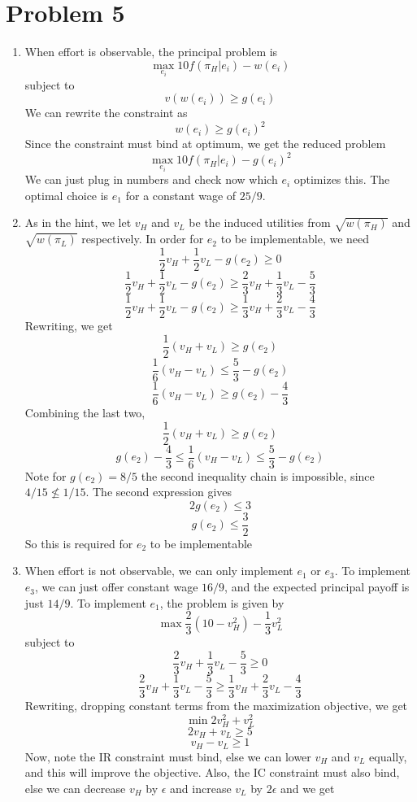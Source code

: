 \documentclass[10pt,letter]{article}
\begin{document}
\section*{Problem 5}
\begin{enumerate}[label=(\alph*)]
\item When effort is observable, the principal problem is
\[ \max_{e_i} 10 f(\pi_H|e_i) - w(e_i) \]
subject to
\[  v(w(e_i)) \ge g(e_i)\]
We can rewrite the constraint as
\[ w(e_i) \ge g(e_i)^2 \]
Since the constraint must bind at optimum, we get the reduced problem
\[ \max_{e_i} 10 f(\pi_H|e_i)  - g(e_i)^2 \]
We can just plug in numbers and check now which $e_i$ optimizes this. The optimal choice is $e_1$ for a constant wage of $25/9$.
\item As in the hint, we let $v_H$ and $v_L$ be the induced utilities from $\sqrt{w(\pi_H)}$ and $\sqrt{w(\pi_L)}$ respectively. In order for $e_2$ to be implementable, we need
\[ \frac{1}{2}v_H + \frac{1}{2} v_L - g(e_2) \ge 0 \]
\[ \frac{1}{2}v_H + \frac{1}{2} v_L - g(e_2) \ge \frac{2}{3}v_H + \frac{1}{3}v_L - \frac{5}{3} \]
\[ \frac{1}{2}v_H + \frac{1}{2} v_L - g(e_2) \ge \frac{1}{3}v_H + \frac{2}{3}v_L - \frac{4}{3} \]
Rewriting, we get
\[ \frac{1}{2}(v_H + v_L) \ge g(e_2) \]
\[   \frac{1}{6} (v_H - v_L) \le \frac{5}{3} - g(e_2)\]
\[ \frac{1}{6}(v_H - v_L)  \ge g(e_2) - \frac{4}{3}\]
Combining the last two,
\[ \frac{1}{2}(v_H + v_L) \ge g(e_2) \]
\[  g(e_2) - \frac{4}{3} \le \frac{1}{6} (v_H - v_L) \le \frac{5}{3} - g(e_2)\]
Note for $g(e_2) = 8/5$ the second inequality chain is impossible, since $4/15 \not\le 1/15$. The second expression gives
\[ 2 g(e_2) \le 3 \]
\[ g(e_2) \le \frac{3}{2} \]
So this is required for $e_2$ to be implementable
\item When effort is not observable, we can only implement $e_1$ or $e_3$. To implement $e_3$, we can just offer constant wage $16/9$, and the expected principal payoff is just $14/9$. To implement $e_1$, the problem is given by
\[ \max \frac{2}{3}(10 - v_H^2) - \frac{1}{3} v_L^2 \]
subject to
\[ \frac{2}{3}v_H + \frac{1}{3}v_L - \frac{5}{3} \ge 0 \]
\[ \frac{2}{3}v_H + \frac{1}{3}v_L - \frac{5}{3} \ge \frac{1}{3}v_H + \frac{2}{3}v_L - \frac{4}{3} \]
Rewriting, dropping constant terms from the maximization objective, we get
\[ \min 2 v_H^2 + v_L^2 \]
\[ 2v_H + v_L \ge 5 \]
\[ v_H - v_L  \ge 1 \]
Now, note the IR constraint must bind, else we can lower $v_H$ and $v_L$ equally, and this will improve the objective. Also, the IC constraint must also bind, else we can decrease $v_H$ by $\epsilon$ and increase $v_L$ by $2\epsilon$ and we get

\end{enumerate}
\end{document}
